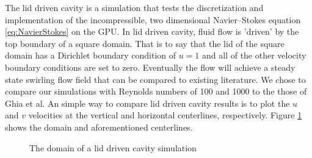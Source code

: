 \documentclass[onehalf,11pt]{beavtex}
\begin{document}
The lid driven cavity is a simulation that tests the discretization and implementation of the incompressible, two dimensional Navier--Stokes equation \eqref{eq:NavierStokes} on the GPU.
In lid driven cavity, fluid flow is 'driven' by the top boundary of a square domain.
That is to say that the lid of the square domain has a Dirichlet boundary condition of $u=1$ and all of the other velocity boundary conditions are set to zero.
Eventually the flow will achieve a steady state swirling flow field that can be compared to existing literature.
We chose to compare our simulations with Reynolds numbers of 100 and 1000 to the those of Ghia et al\cite{Ghia:1982el}.
An simple way to compare lid driven cavity results is to plot the $u$ and $v$ velocities at the vertical and horizontal centerlines, respectively.
Figure \ref{fig:lid driven cavity} shows the domain and aforementioned centerlines.
\begin{figure}[h]
	\centering
	
	\caption{The domain of a lid driven cavity simulation}
	\label{fig:lid driven cavity}
\end{figure}
\end{document}
